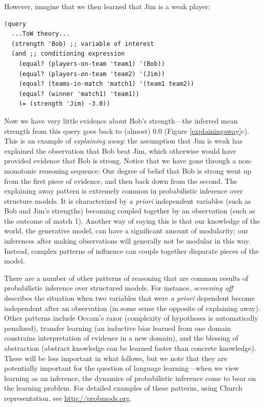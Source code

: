 \documentclass[pdfextras]{handbook}
\begin{document}
However, imagine that we then learned that Jim is a weak player:
 \begin{lstlisting}[mathescape]
(query
  ...ToW theory...
  (strength 'Bob) ;; variable of interest 
  (and ;; conditioning expression
    (equal? (players-on-team 'team1) '(Bob))
    (equal? (players-on-team 'team2) '(Jim))
    (equal? (teams-in-match 'match1) '(team1 team2))
    (equal? (winner 'match1) 'team1))
    (= (strength 'Jim) -3.0))
\end{lstlisting}
Now we have very little evidence about Bob's strength---the inferred mean strength from this query goes back to (almost) 0.0 (Figure \ref{explainingaway}c). 
This is an example of \emph{explaining away}: the assumption that Jim is weak has explained the observation that Bob beat Jim, which otherwise would have provided evidence that Bob is strong. 
Notice that we have gone through a non-monotonic reasoning sequence: Our degree of belief that Bob is strong went up from the first piece of evidence, and then back down from the second. 
The explaining away pattern is extremely common in probabilistic inference over structure models. 
It is characterized by \emph{a priori} independent variables (such as Bob and Jim's strengths) becoming coupled together by an observation (such as the outcome of match 1). 
Another way of saying this is that our knowledge of the world, the generative model, can have a significant amount of modularity; our inferences after making observations will generally not be modular in this way. Instead, complex patterns of influence can couple together disparate pieces of the model.


There are a number of other patterns of reasoning that are common results of probabilistic inference over structured models. 
For instance, \emph{screening off} describes the situation when two variables that were \emph{a priori} dependent become independent after an observation (in some sense the opposite of explaining away).
Other patterns include Occam's razor (complexity of hypotheses is automatically penalized), transfer learning (an inductive bias learned from one domain constrains interpretation of evidence in a new domain), and the blessing of abstraction (abstract knowledge can be learned faster than concrete knowledge). 
These will be less important in what follows, but we note that they are potentially important for the question of language learning---when we view learning as an inference, the dynamics of probabilistic inference come to bear on the learning problem. For detailed examples of these patterns, using Church representation, see \url{http://probmods.org}.
 
\end{document}
